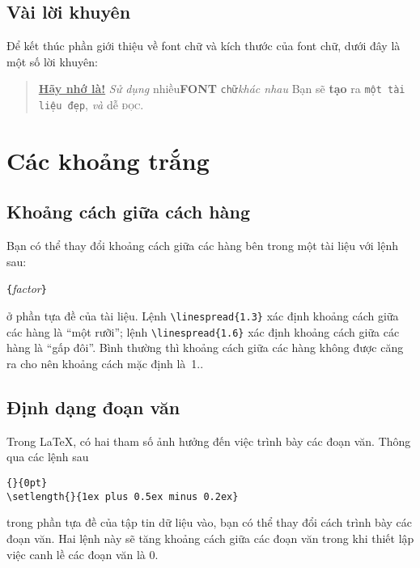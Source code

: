 \subsection{Vài lời khuyên}
Để kết thúc phần giới thiệu về font chữ và kích thước của font
chữ, dưới đây là một số lời khuyên:\nopagebreak

\begin{quote}
  \underline{\textbf{Hãy nhớ là\Huge!}} \textit{Sử dụng}
  \textsf{nhiều\textbf{\LARGE FONT} \texttt{chữ}\textsl{khác nhau}} \Huge
  Bạn \tiny sẽ \footnotesize \textbf{tạo} ra \small \texttt{một tài liệu đẹp},
  \large \textit{và} \normalsize dễ \textsc{đọc}.
\end{quote}

\section{Các khoảng trắng}

\subsection{Khoảng cách giữa cách hàng}

 Bạn có thể thay đổi khoảng cách
giữa các hàng bên trong một tài liệu với lệnh sau:
\begin{lscommand}
\verb|{|\emph{factor}\verb|}|
\end{lscommand}
\noindent ở phần tựa đề của tài liệu. Lệnh \verb|\linespread{1.3}|
xác định khoảng cách giữa các hàng là ``một rưỡi''; lệnh
\verb|\linespread{1.6}| xác định khoảng cách giữa các hàng là
``gấp đôi''. Bình thường thì khoảng cách giữa các hàng không được
căng ra cho nên khoảng cách mặc định là~1..

\subsection{Định dạng đoạn văn}\label{parsp}
Trong \LaTeX{}, có hai tham số ảnh hưởng đến việc trình bày các
đoạn văn. Thông qua các lệnh sau

\begin{code}
\verb|{|\verb|}{0pt}| \\
\verb|\setlength{|\verb|}{1ex plus 0.5ex minus 0.2ex}|
\end{code}
trong phần tựa đề của tập tin dữ liệu vào, bạn có thể thay đổi
cách trình bày các đoạn văn. Hai lệnh này sẽ tăng khoảng cách giữa
các đoạn văn trong khi thiết lập việc canh lề các đoạn văn là 0.

